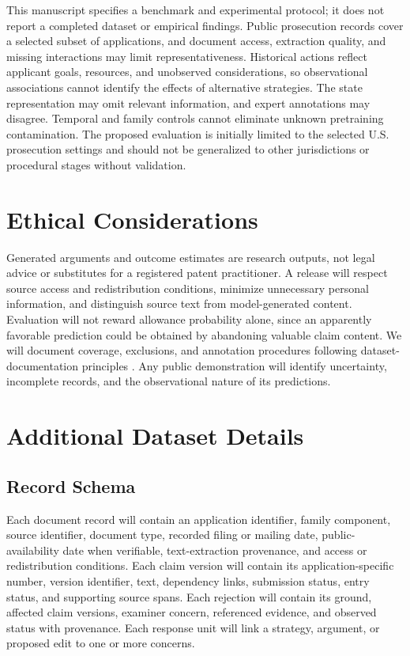 \documentclass[11pt]{article}
\begin{document}
This manuscript specifies a benchmark and experimental protocol; it does not report a completed dataset or empirical findings. Public prosecution records cover a selected subset of applications, and document access, extraction quality, and missing interactions may limit representativeness. Historical actions reflect applicant goals, resources, and unobserved considerations, so observational associations cannot identify the effects of alternative strategies. The state representation may omit relevant information, and expert annotations may disagree. Temporal and family controls cannot eliminate unknown pretraining contamination. The proposed evaluation is initially limited to the selected U.S. prosecution settings and should not be generalized to other jurisdictions or procedural stages without validation.

\section*{Ethical Considerations}

Generated arguments and outcome estimates are research outputs, not legal advice or substitutes for a registered patent practitioner. A release will respect source access and redistribution conditions, minimize unnecessary personal information, and distinguish source text from model-generated content. Evaluation will not reward allowance probability alone, since an apparently favorable prediction could be obtained by abandoning valuable claim content. We will document coverage, exclusions, and annotation procedures following dataset-documentation principles \citep{gebru2021datasheets}. Any public demonstration will identify uncertainty, incomplete records, and the observational nature of its predictions.




\appendix

\section{Additional Dataset Details}
\label{sec:appendix-add-dataset-details}

\subsection{Record Schema}
\label{sec:appendix-schema}

Each document record will contain an application identifier, family component, source identifier, document type, recorded filing or mailing date, public-availability date when verifiable, text-extraction provenance, and access or redistribution conditions. Each claim version will contain its application-specific number, version identifier, text, dependency links, submission status, entry status, and supporting source spans. Each rejection will contain its ground, affected claim versions, examiner concern, referenced evidence, and observed status with provenance. Each response unit will link a strategy, argument, or proposed edit to one or more concerns.
\end{document}
